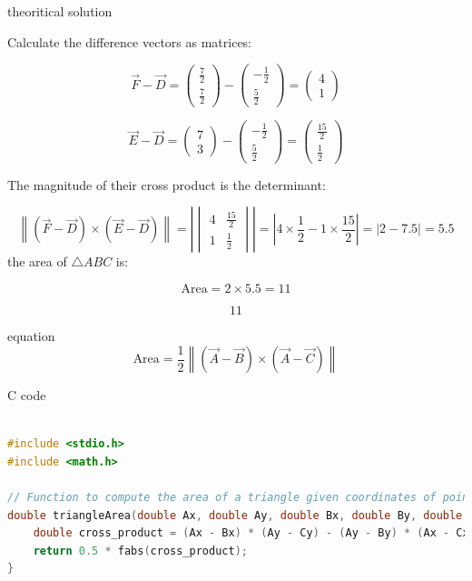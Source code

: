 \documentclass{beamer}
\begin{document}
\begin{frame}{theoritical solution}
    

Calculate the difference vectors as matrices:

\[
\vec{F} - \vec{D} =
\begin{pmatrix}
\frac{7}{2} \\
\frac{7}{2}
\end{pmatrix}
-
\begin{pmatrix}
-\frac{1}{2} \\
\frac{5}{2}
\end{pmatrix}
=
\begin{pmatrix}
4 \\
1
\end{pmatrix}
\]

\[
\vec{E} - \vec{D} =
\begin{pmatrix}
7 \\
3
\end{pmatrix}
-
\begin{pmatrix}
-\frac{1}{2} \\
\frac{5}{2}
\end{pmatrix}
=
\begin{pmatrix}
\frac{15}{2} \\
\frac{1}{2}
\end{pmatrix}
\]

The magnitude of their cross product is the determinant:

\[
\left\| (\vec{F} - \vec{D}) \times (\vec{E} - \vec{D}) \right\| = 
\left|
\begin{vmatrix}
4 & \frac{15}{2} \\
1 & \frac{1}{2}
\end{vmatrix}
\right| = \left| 4 \times \frac{1}{2} - 1 \times \frac{15}{2} \right| = |2 - 7.5| = 5.5
\]
 the area of \(\triangle ABC\) is:

\[
\text{Area} = 2 \times 5.5 = 11
\]

\[
\boxed{11}
\] 
\end{frame}
\begin{frame}{equation}
  \[
\text{Area} = \frac{1}{2} \left\| (\vec{A} - \vec{B}) \times (\vec{A} - \vec{C}) \right\|
\]
  
\end{frame}
\begin{frame}[fragile]{C code}
\begin{lstlisting}[language=C]

#include <stdio.h>
#include <math.h>

// Function to compute the area of a triangle given coordinates of points
double triangleArea(double Ax, double Ay, double Bx, double By, double Cx, double Cy) {
    double cross_product = (Ax - Bx) * (Ay - Cy) - (Ay - By) * (Ax - Cx);
    return 0.5 * fabs(cross_product);
}



\end{lstlisting}
\end{frame}
\end{document}
